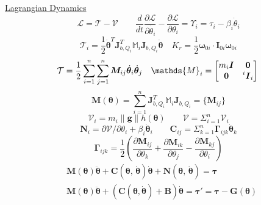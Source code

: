\documentclass[twocolumn]{article}    %
\begin{document}
\newpage
\noindent\underline{Lagrangian Dynamics}
\begin{equation*}
    \mathcal{L} = \mathcal{T} - \mathcal{V} \quad \quad \frac{d}{dt}\frac{\partial \mathcal{L}}{\partial \dot{\theta_i}} - \frac{\partial \mathcal{L}}{\partial \theta_i} = \Upsilon_i =\tau_i -\beta_i\dot{\theta}_i
\end{equation*}
\begin{equation*}
    \mathcal{T}_i = \frac{1}{2} \dot{\bm{\theta}}^T \bm{J}_{b,Q_i}^T \mathds{M}_i\bm{J}_{b,Q_i}\dot{\bm{\theta}} 
    \quad K_r = \frac{1}{2}\bm{\omega}_{0i} \cdot \bm{I}_{0i}\bm{\omega}_{0i}
\end{equation*}
\begin{equation*}
    \hspace{-2pt} \mathcal{T} = \frac{1}{2}\sum_{i=1}^n\sum_{j=1}^n \bm{M}_{ij} \dot{\bm{\theta}}_i\dot{\bm{\theta}}_j \quad \mathds{M}_i = \begin{bmatrix}
        m_i\bm{I} & \bm{0} \\ \bm{0} & \prescript{i}{}{\bm{I}}_i
    \end{bmatrix}
\end{equation*}
\begin{equation*}
    \bm{M}(\bm{\theta}) = \sum_{i=1}^n \bm{J}_{b,Q_i}^T\mathds{M}_i \bm{J}_{b,Q_i} = \{\bm{M}_{ij}\}
\end{equation*}
\begin{equation*}
    \mathcal{V}_i = m_i\|\bm{g}\|h(\bm{\theta}) \quad\quad \mathcal{V} = \Sigma_{i=1}^n\mathcal{V}_i
\end{equation*}
\begin{equation*}
    \bm{N}_i = \partial \mathcal{V} /\partial \theta_i + \beta_i\dot{\bm{\theta}}_i \quad \quad \bm{C}_{ij} = \Sigma_{k=1}^n \bm{\Gamma}_{ijk} \dot{\bm{\theta}}_k 
\end{equation*}
\begin{equation*}
    \bm{\Gamma}_{ijk} = \frac{1}{2}\left(\frac{\partial \bm{M}_{ij}}{\partial \theta_k} + \frac{\partial \bm{M}_{ik}}{\partial \theta_j} - \frac{\partial \bm{M}_{kj}}{\partial \theta_i} \right)
\end{equation*}
\begin{align*}
    &\bm{M}(\bm{\theta}) \ddot{\bm{\theta}} + \bm{C}(\bm{\theta},\, \dot{\bm{\theta}})\dot{\bm{\theta}} + \bm{N}(\bm{\theta},\,\dot{\bm{\theta}}) = \bm{\tau} \\
    &\bm{M}(\bm{\theta})\ddot{\bm{\theta}}+ (\bm{C}(\bm{\theta}, \dot{\bm{\theta}}) + \bm{B}) \dot{\bm{\theta}} = \bm{\tau}' = \bm{\tau} - \bm{G}(\bm{\theta})
\end{align*}
\end{document}
